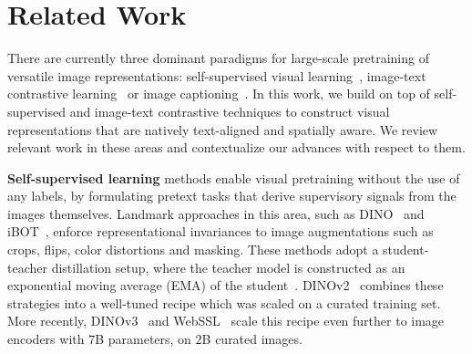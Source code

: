\section{Related Work}
\label{relatedwork}

There are currently three dominant paradigms for large-scale pretraining of versatile image representations: self-supervised visual learning~\cite{chen2020simclr,assran2023ijepa,he2022mae}, image-text contrastive learning~\cite{radford2021clip,jia2021align,cherti2023reproducible} or image captioning~\cite{tschannen2023cappa,tschannen2024locca,fini2025aimv2}.
In this work, we build on top of self-supervised and image-text contrastive techniques to construct visual representations that are natively text-aligned and spatially aware.
We review relevant work in these areas and contextualize our advances with respect to them.

\noindent\textbf{Self-supervised learning} methods enable visual pretraining without the use of any labels, by formulating pretext tasks that derive supervisory signals from the images themselves.
Landmark approaches in this area, such as DINO~\cite{caron2021dino} and iBOT~\cite{zhou2022ibot}, enforce representational invariances to image augmentations such as crops, flips, color distortions and masking.
These methods adopt a student-teacher distillation setup, where the teacher model is constructed as an exponential moving average (EMA) of the student~\cite{he2020moco}.
DINOv2~\cite{oquab2024dinov2} combines these strategies into a well-tuned recipe which was scaled on a curated training set.
More recently, DINOv3~\cite{siméoni2025dinov3} and WebSSL~\cite{fan2025scalinglanguagefreevisualrepresentation} scale this recipe even further to image encoders with $7$B parameters, on $2$B curated images.

